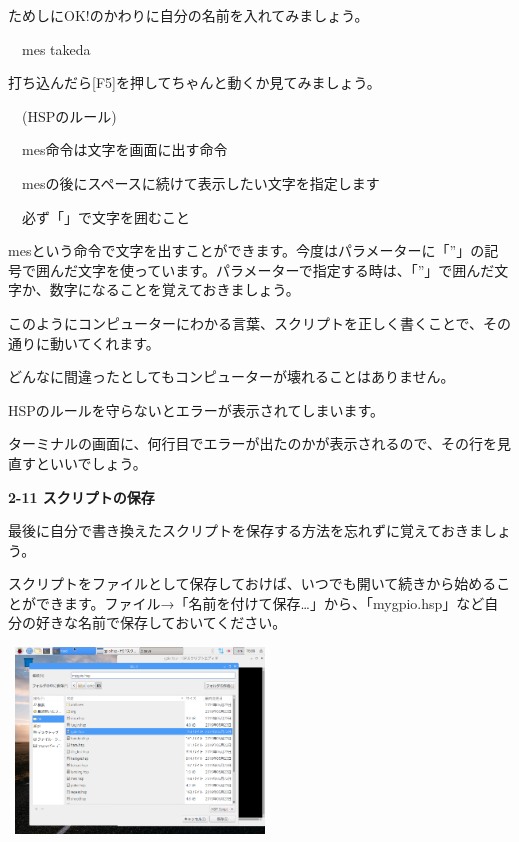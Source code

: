 \documentclass[a4paper,dvipdfmx]{jarticle}
\newcommand\textstyleqwerty[1]{#1}
\begin{document}
ためしに{\textquotedbl}OK!{\textquotedbl}のかわりに自分の名前を入れてみましょう。


\bigskip

\ \ mes {\textquotedbl}takeda{\textquotedbl}


\bigskip

打ち込んだら[F5]を押してちゃんと動くか見てみましょう。


\bigskip

\ \ (HSPのルール)


\bigskip

\ \ mes命令は文字を画面に出す命令

\ \ mesの後にスペースに続けて表示したい文字を指定します

\ \ 必ず「{\textquotedbl}」で文字を囲むこと


\bigskip

mesという命令で文字を出すことができます。今度はパラメーターに「”」の記号で囲んだ文字を使っています。パラメーターで指定する時は、「”」で囲んだ文字か、数字になることを覚えておきましょう。


\bigskip

このようにコンピューターにわかる言葉、スクリプトを正しく書くことで、その通りに動いてくれます。

どんなに間違ったとしてもコンピューターが壊れることはありません。

HSPのルールを守らないとエラーが表示されてしまいます。

ターミナルの画面に、何行目でエラーが出たのかが表示されるので、その行を見直すといいでしょう。


\bigskip


\bigskip

\textstyleqwerty{\textbf{2-11 スクリプトの保存}}


\bigskip

最後に自分で書き換えたスクリプトを保存する方法を忘れずに覚えておきましょう。

スクリプトをファイルとして保存しておけば、いつでも開いて続きから始めることができます。ファイル→「名前を付けて保存…」から、「mygpio.hsp」など自分の好きな名前で保存しておいてください。


\bigskip



\begin{center}
\includegraphics[width=6.976cm,height=4.944cm]{text02-img/text02-img028.png}

\end{center}
\end{document}

